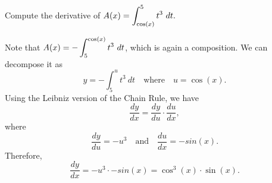 \begin{example} %
Compute the derivative of $\displaystyle A(x) = \int_{\cos(x)}^5 t^3\ dt.$

\solution Note that $\displaystyle A(x) = -\int_5^{\cos(x)} t^3\ dt$, which is again a composition. We can decompose it as
\[ y = -\int_5^u t^3 \ dt \quad \mbox{where} \quad u = \cos(x). \]
Using the Leibniz version of the Chain Rule, we have
\[ \frac{dy}{dx} = \frac{dy}{du} \cdot \frac{du}{dx}, \] 
where
\[ \frac{dy}{du} = -u^3 \quad \mbox{and} \quad \frac{du}{dx} = -sin(x). \]
Therefore,
\[ \frac{dy}{dx} = -u^3 \cdot -sin(x) = \cos^3(x) \cdot \sin(x). \]
\end{example}
